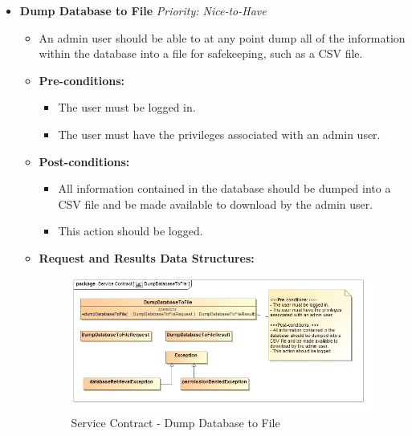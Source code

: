 \documentclass{article}
\begin{document}
\begin{itemize}
					\cleardoublepage
					\item \textbf{Dump Database to File} \hfill \textit{Priority: Nice-to-Have}
					\begin{itemize}
						\item An admin user should be able to at any point dump all of the information within the database into a file for safekeeping, such as a CSV file.
						\item \textbf{Pre-conditions:}
						\begin{itemize}
							\item The user must be logged in.
							\item The user must have the privileges associated with an admin user.
						\end{itemize}
						\item \textbf{Post-conditions:}
						\begin{itemize}
							\item All information contained in the database should be dumped into a CSV file and be made available to download by the admin user.
							\item This action should be logged.
						\end{itemize}
						\item \textbf{Request and Results Data Structures:}
						\begin{figure}[H]
							\includegraphics[width=\linewidth]{../Diagrams/ServiceContracts/Reporting subsystem/DumpDatabaseToFile.jpg}
							\caption{Service Contract - Dump Database to File}
						\end{figure}
					\end{itemize}
				\end{itemize}
			
			\cleardoublepage
\end{document}

